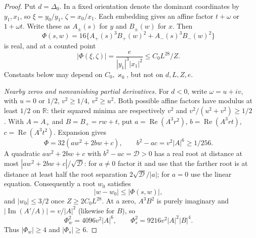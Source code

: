 \documentclass[11pt,reqno]{amsart}
\theoremstyle{definition}
\theoremstyle{remark}
\numberwithin{equation}{section}
\newcommand{\R}{\mathbb R}\newcommand{\Z}{\mathbb Z}\newcommand{\N}{\mathbb N}
\begin{document}
\begin{proof}
Put $d=\Delta_0$. In a fixed orientation denote the dominant coordinates
by $y_1,x_1$, so $\xi=y_0/y_1$, $\zeta=x_0/x_1$.
Each embedding gives an affine factor $t+\omega$ or $1+\omega t$.
Write these as $A_\pm(s)$ for $y$ and $B_\pm(w)$ for $x$. Then
\[
 \Phi(s,w)=16\{A_+(s)^3B_+(w)^2+A_-(s)^3B_-(w)^2\}
\]
is real, and at a counted point
\begin{equation}\label{eq:A3smalltrace}
 |\Phi(\xi,\zeta)|=\frac e{|y_1|^3|x_1|^2}\le C_0L^{28}/Z.
\end{equation}
Constants below may depend on $C_0,\varkappa_0$, but not on $d,L,Z,e$.

\emph{Nearby zeros and nonvanishing partial derivatives.}
For $d<0$, write $\omega=u+iv$, with $u=0$ or $1/2$,
$v^2\ge1/4$, $v^2\ge u^2$. Both possible affine factors have modulus
at least $1/2$ on $\R$: their squared minima are respectively $v^2$
and $v^2/(u^2+v^2)\ge1/2$.
With $A=A_+$ and $B=B_+=rw+t$, put
$a=\operatorname{Re}(A^3r^2)$, $b=\operatorname{Re}(A^3rt)$,
$c=\operatorname{Re}(A^3t^2)$. Expansion gives
\begin{equation}\label{eq:A3imagdisc}
 \Phi=32(aw^2+2bw+c),\qquad b^2-ac=v^2|A|^6\ge1/256.
\end{equation}
A quadratic $aw^2+2bw+c$ with $b^2-ac=\mathcal D>0$ has a real root
at distance at most $|aw^2+2bw+c|/\sqrt{\mathcal D}$: for $a\ne0$
factor it and use that the farther root is at distance at least half
the root separation $2\sqrt{\mathcal D}/|a|$; for $a=0$ use the
linear equation. Consequently a root $w_0$ satisfies
\begin{equation}\label{eq:A3imagclose}
 |w-w_0|\le|\Phi(s,w)|,
\end{equation}
and $|w_0|\le3/2$ once $Z\ge2C_0L^{28}$.
At a zero, $A^3B^2$ is purely imaginary and
$|\operatorname{Im}(A'/A)|=v/|A|^2$ (likewise for $B$), so
\begin{equation}\label{eq:A3imagpartials}
 \Phi_w^2=4096v^2|A|^6,\qquad
 \Phi_s^2=9216v^2|A|^2|B|^4.
\end{equation}
Thus $|\Phi_w|\ge4$ and $|\Phi_s|\ge6$.


\end{proof}
\end{document}
